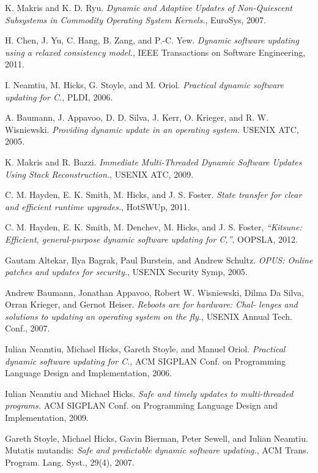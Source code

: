 \documentclass[a4paper,11pt,twoside]{article}
\begin{document}
\begin{thebibliography}{1}
   K. Makris and K. D. Ryu. {\em Dynamic and Adaptive Updates of Non-Quiescent Subsystems in Commodity Operating System Kernels.}, EuroSys, 2007. 
  
   H. Chen, J. Yu, C. Hang, B. Zang, and P.-C. Yew. {\em Dynamic software updating using a relaxed consistency model.}, IEEE Transactions on Software Engineering, 2011.

   I. Neamtiu, M. Hicks, G. Stoyle, and M. Oriol. {\em Practical dynamic software updating for C.}, PLDI, 2006.
  
   A. Baumann, J. Appavoo, D. D. Silva, J. Kerr, O. Krieger, and R. W. Wisniewski. {\em Providing dynamic update in an operating system.} USENIX ATC, 2005. 

   K. Makris and R. Bazzi. {\em Immediate Multi-Threaded Dynamic Software Updates Using Stack Reconstruction.}, USENIX ATC, 2009.

  C. M. Hayden, E. K. Smith, M. Hicks, and J. S. Foster. {\em State transfer for clear and efficient runtime upgrades.}, HotSWUp, 2011.
 
   C. M. Hayden, E. K. Smith, M. Denchev, M. Hicks, and J. S. Foster, {\em “Kitsune: Efficient, general-purpose dynamic software updating for C,”}, OOPSLA, 2012.
  
   Gautam Altekar, Ilya Bagrak, Paul Burstein, and Andrew Schultz. {\em OPUS: Online patches and updates for security.}, USENIX Security Symp, 2005. 

   Andrew Baumann, Jonathan Appavoo, Robert W. Wisniewski, Dilma Da Silva, Orran Krieger, and Gernot Heiser. {\em Reboots are for hardware: Chal- lenges and solutions to updating an operating system on the fly.}, USENIX Annual Tech. Conf., 2007. 
  
   Iulian Neamtiu, Michael Hicks, Gareth Stoyle, and Manuel Oriol. {\em Practical dynamic software updating for C.}, ACM SIGPLAN Conf. on Programming Language Design and Implementation, 2006.

   Iulian Neamtiu and Michael Hicks. {\em Safe and timely updates to multi-threaded programs.} ACM SIGPLAN Conf. on Programming Language Design and Implementation,  2009.

   Gareth Stoyle, Michael Hicks, Gavin Bierman, Peter Sewell, and Iulian Neamtiu. Mutatis mutandis: {\em Safe and predictable dynamic software updating.}, ACM Trans. Program. Lang. Syst., 29(4), 2007.
  

\end{thebibliography}
\end{document}
